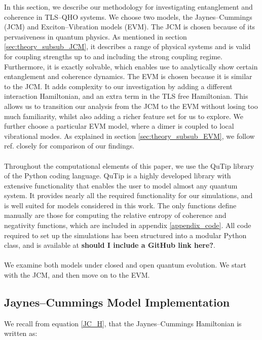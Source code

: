 \documentclass[11pt]{article}
\begin{document}
In this section, we describe our methodology for investigating entanglement and coherence in TLS--QHO systems. We choose two models, the Jaynes--Cummings (JCM) and Exciton--Vibration models (EVM). The JCM is chosen because of its pervasiveness in quantum physics. As mentioned in section \ref{sec:theory_subsub_JCM}, it describes a range of physical systems and is valid for coupling strengths up to and including the strong coupling regime. Furthermore, it is exactly solvable, which enables use to analytically show certain entanglement and coherence dynamics. 
The EVM is chosen because it is similar to the JCM. It adds complexity to our investigation by adding a different interaction Hamiltonian, and an extra term in the TLS  free Hamiltonian. This allows us to transition our analysis from the JCM to the EVM without losing too much familiarity, whilst also adding a richer feature set for us to explore. We further choose a particular EVM model, where a dimer is coupled to local vibrational modes. As explained in section \ref{sec:theory_subsub_EVM}, we follow ref. \cite{ExVib2014-Alexandra} closely for comparison of our findings. \\
\\
Throughout the computational elements of this paper, we use the QuTip library of the Python coding language. QuTip is a highly developed library with extensive functionality that enables the user to model almost any quantum system. It provides nearly all the required functionality for our simulations, and is well suited for models considered in this work. The only functions define manually are those for computing the relative entropy of coherence and negativity functions, which are included in appendix \ref{appendix_code}. All code required to set up the simulations has been structured into a modular Python class, and is available at \textbf{should I include a GitHub link here?}.\\
\\
We examine both models under closed and open quantum evolution. We start with the JCM, and then move on to the EVM.

\subsection{Jaynes--Cummings Model Implementation} \label{sec:method_sub_JCM}

We recall from equation \eqref{JC_H}, that the Jaynes--Cummings Hamiltonian is written as:
\end{document}
